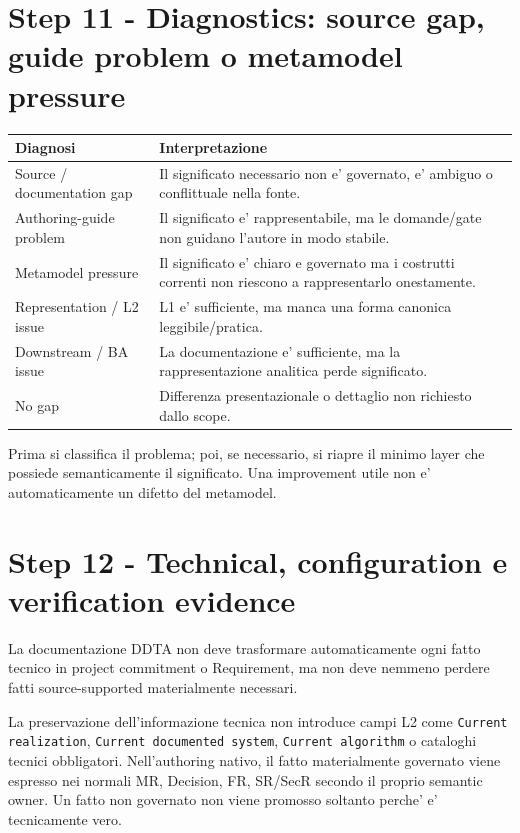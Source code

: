 \documentclass[11pt,a4paper]{article}
\begin{document}
\section{Step 11 - Diagnostics: source gap, guide problem o metamodel pressure}
\holdouttag

\begin{tabularx}{\textwidth}{L{45mm}Y}
\toprule
\textbf{Diagnosi} & \textbf{Interpretazione} \\
\midrule
Source / documentation gap & Il significato necessario non e' governato, e' ambiguo o conflittuale nella fonte. \\
Authoring-guide problem & Il significato e' rappresentabile, ma le domande/gate non guidano l'autore in modo stabile. \\
Metamodel pressure & Il significato e' chiaro e governato ma i costrutti correnti non riescono a rappresentarlo onestamente. \\
Representation / L2 issue & L1 e' sufficiente, ma manca una forma canonica leggibile/pratica. \\
Downstream / BA issue & La documentazione e' sufficiente, ma la rappresentazione analitica perde significato. \\
No gap & Differenza presentazionale o dettaglio non richiesto dallo scope. \\
\bottomrule
\end{tabularx}

\begin{ddtacore}[title={Minimum owning layer}]
Prima si classifica il problema; poi, se necessario, si riapre il minimo layer che possiede semanticamente il significato. Una improvement utile non e' automaticamente un difetto del metamodel.
\end{ddtacore}

\section{Step 12 - Technical, configuration e verification evidence}
\holdouttag

La documentazione DDTA non deve trasformare automaticamente ogni fatto tecnico in project commitment o Requirement, ma non deve nemmeno perdere fatti source-supported materialmente necessari.

\begin{ddtaprinciple}[title={Nessun technical-document model parallelo}]
La preservazione dell'informazione tecnica non introduce campi L2 come \texttt{Current realization}, \texttt{Current documented system}, \texttt{Current algorithm} o cataloghi tecnici obbligatori. Nell'authoring nativo, il fatto materialmente governato viene espresso nei normali MR, Decision, FR, SR/SecR secondo il proprio semantic owner. Un fatto non governato non viene promosso soltanto perche' e' tecnicamente vero.
\end{ddtaprinciple}
\end{document}
